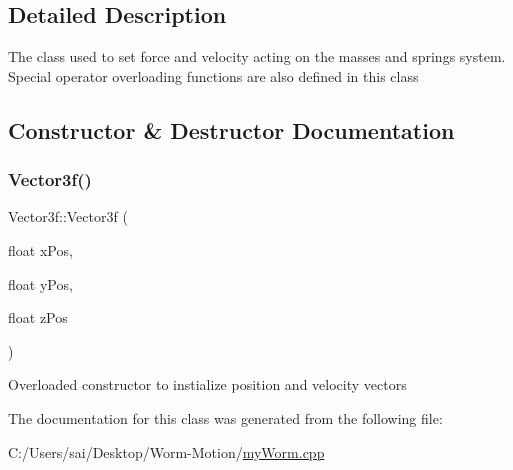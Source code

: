 \subsection{Detailed Description}
The class used to set force and velocity acting on the masses and springs system. Special operator overloading functions are also defined in this class 

\subsection{Constructor \& Destructor Documentation}
\mbox{\label{class_vector3f_aac9805649d4f118145b06f54afc57474}} 
\subsubsection{\texorpdfstring{Vector3f()}{Vector3f()}}
{\footnotesize\ttfamily Vector3f\+::\+Vector3f (\begin{DoxyParamCaption}\item[{float}]{x\+Pos,  }\item[{float}]{y\+Pos,  }\item[{float}]{z\+Pos }\end{DoxyParamCaption})}

Overloaded constructor to instialize position and velocity vectors 

The documentation for this class was generated from the following file\+:\begin{DoxyCompactItemize}
\item 
C\+:/\+Users/sai/\+Desktop/\+Worm-\/\+Motion/\mbox{\hyperlink{my_worm_8cpp}{my\+Worm.\+cpp}}\end{DoxyCompactItemize}
